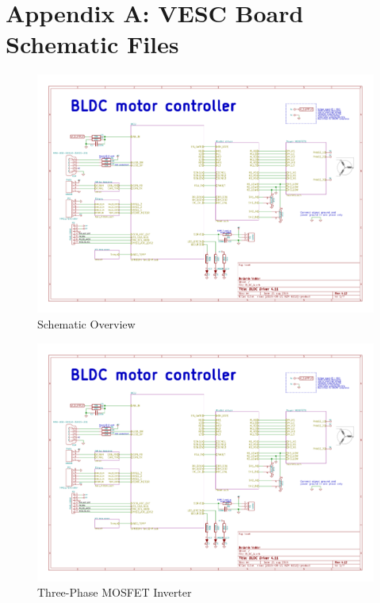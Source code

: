 \chapter{Appendix A: VESC Board Schematic Files}\label{appendix:vesc_schematics}

\begin{figure}
    \includegraphics[width=\textwidth,page=1]{Images/BLDC_4}
    \caption{Schematic Overview}
    \label{fig:sch1}
\end{figure}

\begin{figure}
    \includegraphics[width=\textwidth,page=2]{Images/BLDC_4}
    \caption{Three-Phase MOSFET Inverter}
    \label{fig:sch2}
\end{figure}

